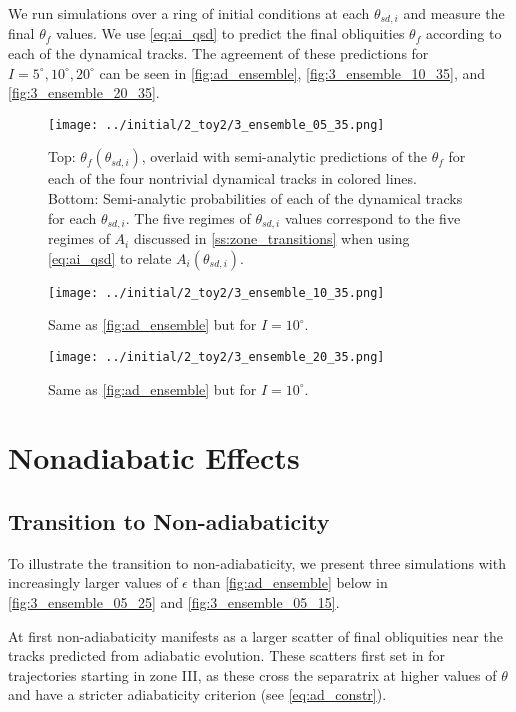 \documentclass[
        fleqn,
        usenatbib,
    ]{mnras}
\newcommand*{\p}[1]{\left(#1\right)}
\begin{document}
We run simulations over a ring of initial conditions at each $\theta_{sd, i}$
and measure the final $\theta_{f}$ values. We use \autoref{eq:ai_qsd} to predict
the final obliquities $\theta_f$ according to each of the dynamical tracks. The
agreement of these predictions for $I = 5^\circ, 10^\circ, 20^\circ$ can be seen
in \autoref{fig:ad_ensemble}, \autoref{fig:3_ensemble_10_35}, and
\autoref{fig:3_ensemble_20_35}.
\begin{figure}
    \centering
    \texttt{[image: ../initial/2\_toy2/3\_ensemble\_05\_35.png]}
    \caption{Top: $\theta_{f}\p{\theta_{sd, i}}$, overlaid with semi-analytic
    predictions of the $\theta_{ f}$ for each of the four nontrivial
    dynamical tracks in colored lines. Bottom: Semi-analytic probabilities of
    each of the dynamical tracks for each $\theta_{sd, i}$. The five regimes of
    $\theta_{sd, i}$ values correspond to the five regimes of $A_i$ discussed in
    \autoref{ss:zone_transitions} when using \autoref{eq:ai_qsd} to relate
    $A_i\p{\theta_{sd, i}}$. }\label{fig:ad_ensemble}
\end{figure}
\begin{figure}
    \centering
    \texttt{[image: ../initial/2\_toy2/3\_ensemble\_10\_35.png]}
    \caption{Same as \autoref{fig:ad_ensemble} but for $I =
    10^\circ$.}\label{fig:3_ensemble_10_35}
\end{figure}
\begin{figure}
    \texttt{[image: ../initial/2\_toy2/3\_ensemble\_20\_35.png]}
    \caption{Same as \autoref{fig:ad_ensemble} but for $I =
    10^\circ$.}\label{fig:3_ensemble_20_35}
\end{figure}

\section{Nonadiabatic Effects}\label{s:nonad}

\subsection{Transition to Non-adiabaticity}

To illustrate the transition to non-adiabaticity, we present three simulations
with increasingly larger values of $\epsilon$ than \autoref{fig:ad_ensemble}
below in \autoref{fig:3_ensemble_05_25} and \autoref{fig:3_ensemble_05_15}.

At first non-adiabaticity manifests as a larger scatter of final obliquities
near the tracks predicted from adiabatic evolution. These scatters first set in
for trajectories starting in zone III, as these cross the separatrix at higher
values of $\theta$ and have a stricter adiabaticity criterion (see
\autoref{eq:ad_constr}).
\end{document}
